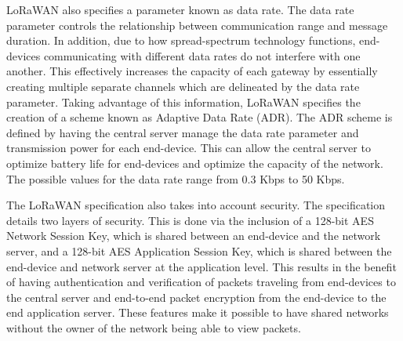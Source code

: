LoRaWAN also specifies a parameter known as data rate. The data rate parameter controls the relationship between communication range and message duration. In addition, due to how spread-spectrum technology functions, end-devices communicating with different data rates do not interfere with one another. This effectively increases the capacity of each gateway by essentially creating multiple separate channels which are delineated by the data rate parameter. Taking advantage of this information, LoRaWAN specifies the creation of a scheme known as Adaptive Data Rate (ADR). The ADR scheme is defined by having the central server manage the data rate parameter and transmission power for each end-device. This can allow the central server to optimize battery life for end-devices and optimize the capacity of the network. The possible values for the data rate range from 0.3 Kbps to 50 Kbps.

The LoRaWAN specification also takes into account security. The specification details two layers of security. This is done via the inclusion of a 128-bit AES Network Session Key, which is shared between an end-device and the network server, and a 128-bit AES Application Session Key, which is shared between the end-device and network server at the application level. This results in the benefit of having authentication and verification of packets traveling from end-devices to the central server and end-to-end packet encryption from the end-device to the end application server. These features make it possible to have shared networks without the owner of the network being able to view packets.
